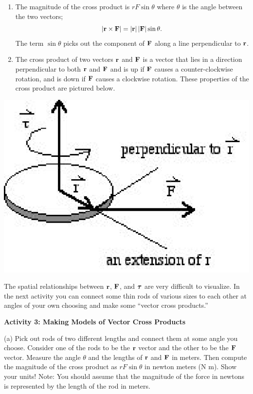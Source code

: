 \begin{enumerate}
\item The magnitude of the cross product is $rF\sin\theta$ where \( \theta  \)
is the angle between the two vectors; 
\[
\left| {\bf r}\times {\bf F}\right| =\left| {\bf r}\right| \left| {\bf F}\right| \sin \theta .\]
The term \( \sin \theta  \) picks out the component of \( {\bf F} \)
along a line perpendicular to \( {\bf r} \).
\item The cross product of two vectors \( {\bf r} \) and \( {\bf F} \)
is a vector that lies in a direction perpendicular to both \( {\bf r} \)
and \( {\bf F} \) and is up if \( {\bf F} \) causes
a counter-clockwise rotation, and is down if \( {\bf F} \) causes
a clockwise rotation. These properties of the cross product are pictured below.
\end{enumerate}
\vspace{0.3cm}
{\par\centering \includegraphics{ang_mom_fig3.eps} \par}
\vspace{0.3cm}

The spatial relationships between \( {\bf r} \), \( {\bf F} \),
and \( {\mbox{\boldmath$\tau$} } \) are very difficult to visualize. In the next
activity you can connect some thin rods of various sizes to each other at angles
of your own choosing and make some ``vector cross products.''

\textbf{Activity 3: Making Models of Vector Cross Products} 

(a) Pick out rods of two different lengths and connect them at some angle you
choose. Consider one of the rods to be the \( {\bf r} \) vector
and the other to be the \( {\bf F} \) vector. Measure the angle
\( \theta  \) and the lengths of \( {\bf r} \) and \( {\bf F} \)
in meters. Then compute the magnitude of the cross product as 
$rF\sin \theta $
in newton meters (N m). Show your units! Note: You should assume that the magnitude
of the force in newtons is represented by the length of the rod in meters.
\vspace{20mm}

